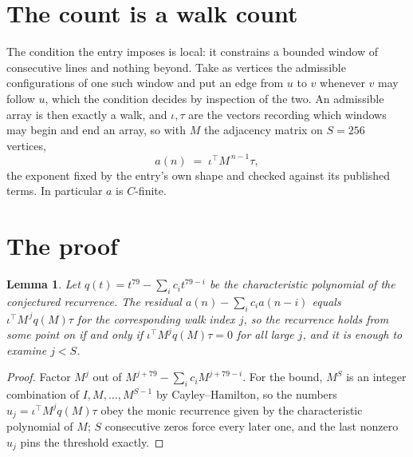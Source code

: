 \documentclass[11pt,a4paper]{article}
\theoremstyle{plain}
\newtheorem{lemma}[theorem]{Lemma}
\theoremstyle{definition}
\begin{document}
\section{The count is a walk count}

The condition the entry imposes is local: it constrains a bounded window of consecutive lines and nothing beyond. Take as vertices the admissible configurations of one such window and put an edge from $u$ to $v$ whenever $v$ may follow $u$, which the condition decides by inspection of the two.
An admissible array is then exactly a walk, and $\iota,\tau$ are the vectors recording which windows may begin and end an array, so with $M$ the adjacency matrix on $S=256$ vertices,
\[
a(n)\;=\;\iota^{\!\top}M^{\,n-1}\tau ,
\]
the exponent fixed by the entry's own shape and checked against its published terms. In
particular $a$ is $C$-finite.

\section{The proof}

\begin{lemma}\label{lem:crit}
Let $q(t)=t^{79}-\sum_i c_it^{79-i}$ be the characteristic polynomial of the
conjectured recurrence. The residual $a(n)-\sum_ic_ia(n-i)$ equals
$\iota^{\!\top}M^{\,j}q(M)\tau$ for the corresponding walk index $j$, so the recurrence
holds from some point on if and only if $\iota^{\!\top}M^{j}q(M)\tau=0$ for all large $j$,
and it is enough to examine $j<S$.
\end{lemma}

\begin{proof}
Factor $M^{j}$ out of $M^{j+79}-\sum_ic_iM^{j+79-i}$. For the bound, $M^{S}$
is an integer combination of $I,M,\dots,M^{S-1}$ by Cayley--Hamilton, so the numbers
$u_j=\iota^{\!\top}M^{j}q(M)\tau$ obey the monic recurrence given by the characteristic
polynomial of $M$; $S$ consecutive zeros force every later one, and the last nonzero $u_j$
pins the threshold exactly.
\end{proof}
\end{document}
